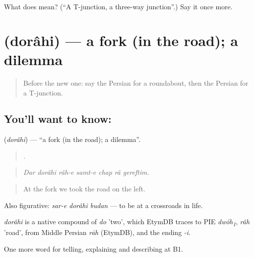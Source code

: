 \begin{tcolorbox}[breakable,colback=teal!4,colframe=teal!35!black,title={Before you move on}]
What does   mean? (\textquotedblleft{}A T-junction, a three-way junction\textquotedblright{}.) Say it once more.
\end{tcolorbox}
\section[\texorpdfstring{\fa{دوراهی} (dorâhi)}{دوراهی (dorâhi)}]{ (dorâhi) — a fork (in the road); a dilemma}

\label{lesson:FA-C445-dorahi}



\begin{quote}
Before the new one: say the Persian for a roundabout, then the Persian for a T-junction.
\end{quote}

\subsection*{You'll want to know: }
\textbf{} (\emph{dorâhi}) — \textquotedblleft{}a fork (in the road); a dilemma\textquotedblright{}.

\begin{quote}
      .
\end{quote}

\begin{quote}
\emph{Dar dorâhi râh-e samt-e chap râ gereftim.}
\end{quote}

\begin{quote}
At the fork we took the road on the left.
\end{quote}

Also figurative: \emph{sar-e dorâhi budan} — to be at a crossroads in life.

\begin{cousinweb}
\emph{dorâhi} is a native compound of \emph{do} 'two', which EtymDB traces to PIE \emph{dwóh\textsubscript{1}}, \emph{râh} 'road', from Middle Persian \emph{rāh} (EtymDB), and the ending \emph{-i}.
\end{cousinweb}

\begin{grammarlens}[title={What you've built}]
One more word for telling, explaining and describing at B1.
\end{grammarlens}

